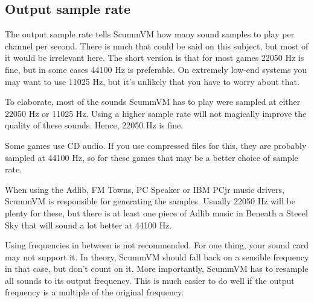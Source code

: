 

\subsection{Output sample rate}

The output sample rate tells ScummVM how many sound samples to play per channel
per second. There is much that could be said on this subject, but most of it
would be irrelevant here. The short version is that for most games 22050 Hz is
fine, but in some cases 44100 Hz is preferable. On extremely low-end systems
you may want to use 11025 Hz, but it's unlikely that you have to worry about
that.

To elaborate, most of the sounds ScummVM has to play were sampled at either
22050 Hz or 11025 Hz. Using a higher sample rate will not magically improve the
quality of these sounds. Hence, 22050 Hz is fine.

Some games use CD audio. If you use compressed files for this, they are
probably sampled at 44100 Hz, so for these games that may be a better choice of
sample rate.

When using the Adlib, FM Towns, PC Speaker or IBM PCjr music drivers, ScummVM
is responsible for generating the samples. Usually 22050 Hz will be plenty for
these, but there is at least one piece of Adlib music in Beneath a Steeel Sky
that will sound a lot better at 44100 Hz.

Using frequencies in between is not recommended. For one thing, your sound card
may not support it. In theory, ScummVM should fall back on a sensible frequency
in that case, but don't count on it. More importantly, ScummVM has to resample
all sounds to its output frequency. This is much easier to do well if the
output frequency is a multiple of the original frequency.
